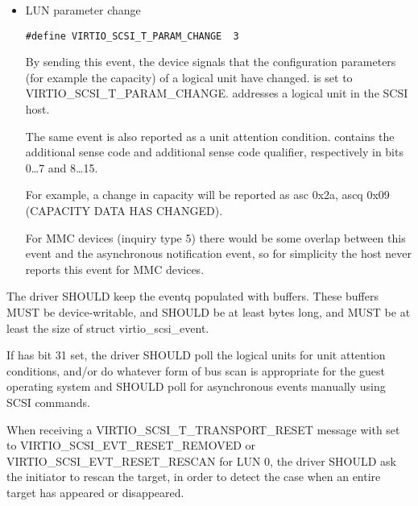 \begin{itemize}
  \item LUN parameter change
\begin{lstlisting}
#define VIRTIO_SCSI_T_PARAM_CHANGE  3
\end{lstlisting}

  By sending this event, the device signals that the configuration parameters
  (for example the capacity) of a logical unit have changed.
   is set to VIRTIO_SCSI_T_PARAM_CHANGE.
   addresses a logical unit in the SCSI host.

  The same event is also reported as a unit attention condition.
   contains the additional sense code and additional sense code qualifier,
  respectively in bits 0\ldots 7 and 8\ldots 15.
  \begin{note}
  For example, a change in capacity will be reported as asc 0x2a, ascq 0x09
  (CAPACITY DATA HAS CHANGED).
  \end{note}

  For MMC devices (inquiry type 5) there would be some overlap between this
  event and the asynchronous notification event, so for simplicity the host never
  reports this event for MMC devices.
\end{itemize}


The driver SHOULD keep the eventq populated with buffers.  These
buffers MUST be device-writable, and SHOULD be at least
 bytes long, and MUST be at least the size of
struct virtio_scsi_event.

If  has bit 31 set, the driver SHOULD
poll the logical units for unit attention conditions, and/or do
whatever form of bus scan is appropriate for the guest operating
system and SHOULD poll for asynchronous events manually using SCSI commands.

When receiving a VIRTIO_SCSI_T_TRANSPORT_RESET message with
 set to VIRTIO_SCSI_EVT_RESET_REMOVED or
VIRTIO_SCSI_EVT_RESET_RESCAN for LUN 0, the driver SHOULD ask the
initiator to rescan the target, in order to detect the case when an
entire target has appeared or disappeared.


